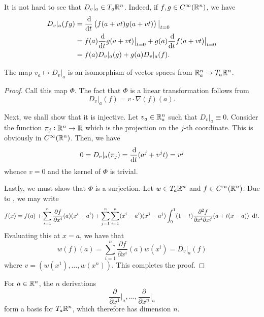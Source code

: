 It is not hard to see that $D_v|_a\in T_a\mathbb{R}^n$. Indeed, if $f,g\in C^\infty(\mathbb{R}^n)$, we have 
\begin{align*}
    D_v|_a(fg) &= \frac{\dif}{\dif t}\left(f(a + vt)g(a + vt)\right)\big|_{t = 0} \\
    &= f(a)\frac{\dif}{\dif t}g(a + vt)\big|_{t = 0} + g(a)\frac{\dif}{\dif t}f(a + vt)\big|_{t = 0} \\
    &= f(a)D_v|_a(g) + g(a)D_v|_{a}(f).
\end{align*}

\begin{proposition}
    The map $v_a\mapsto D_v|_a$ is an isomorphism of vector spaces from $\mathbb{R}^n_a\to T_a\mathbb{R}^n$.
\end{proposition}
\begin{proof}
    Call this map $\Phi$. The fact that $\Phi$ is a linear transformation follows from 
    \begin{equation*}
        D_v|_a(f) = v\cdot\nabla(f)(a).
    \end{equation*}

    Next, we shall show that it is injective. Let $v_a\in\mathbb{R}^n_a$ such that $D_v|_a\equiv 0$. Consider the function $\pi_j: \mathbb{R}^n\to\mathbb{R}$ which is the projection on the $j$-th coordinate. This is obviously in $C^\infty(\mathbb{R}^n)$. Then, we have 
    \begin{equation*}
        0 = D_v|_{a}(\pi_j) = \frac{\dif}{\dif t}(a^{j} + v^{j}t) = v^j
    \end{equation*}
    whence $v = 0$ and the kernel of $\Phi$ is trivial.

    Lastly, we must show that $\Phi$ is a surjection. Let $w\in T_a\mathbb{R}^n$ and $f\in C^\infty(\mathbb{R}^n)$. Due to , we may write 
    \begin{equation*}
        f(x) = f(a) + \sum_{i = 1}^n\frac{\partial f}{\partial x^{i}}(a)(x^i - a^i) + \sum_{j = 1}^n\sum_{i = 1}^n(x^i - a^i)(x^j - a^j)\int_{0}^1(1 - t)\frac{\partial^2 f}{\partial x^i\partial x^j}(a + t(x - a))~\dif t.
    \end{equation*} 
    Evaluating this at $x = a$, we have that 
    \begin{equation*}
        w(f)(a) = \sum_{i = 1}^n\frac{\partial f}{\partial x^i}(a)w(x^{i}) = D_v|_a(f)
    \end{equation*}
    where $v = (w(x^1),\dots,w(x^n))$. This completes the proof.
\end{proof}

\begin{corollary}
    For $a\in\mathbb{R}^n$, the $n$ derivations 
    \begin{equation*}
        \frac{\partial}{\partial x^1}\big|_{a},\dots,\frac{\partial }{\partial x^n}\big|_a
    \end{equation*}
    form a basis for $T_a\mathbb{R}^n$, which therefore has dimension $n$.
\end{corollary}

